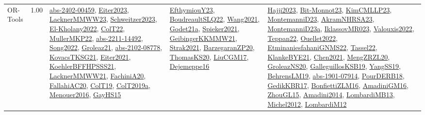 {\begin{longtable}{p{3cm}r>{\raggedright\arraybackslash}p{6cm}>{\raggedright\arraybackslash}p{6cm}>{\raggedright\arraybackslash}p{8cm}}
\index{OR-Tools}\index{CPSystems!OR-Tools}OR-Tools &  1.00 & \hyperref[detail:abs-2402-00459]{abs-2402-00459}, \hyperref[detail:Eiter2023]{Eiter2023}, \hyperref[detail:LacknerMMWW23]{LacknerMMWW23}, \hyperref[detail:Schweitzer2023]{Schweitzer2023}, \hyperref[detail:El-Kholany2022]{El-Kholany2022}, \hyperref[detail:ColT22]{ColT22}, \hyperref[detail:MullerMKP22]{MullerMKP22}, \hyperref[detail:abs-2211-14492]{abs-2211-14492}, \hyperref[detail:Song2022]{Song2022}, \hyperref[detail:Groleaz21]{Groleaz21}, \hyperref[detail:abs-2102-08778]{abs-2102-08778}, \hyperref[detail:KovacsTKSG21]{KovacsTKSG21}, \hyperref[detail:Eiter2021]{Eiter2021}, \hyperref[detail:KoehlerBFFHPSSS21]{KoehlerBFFHPSSS21}, \hyperref[detail:LacknerMMWW21]{LacknerMMWW21}, \hyperref[detail:FachiniA20]{FachiniA20}, \hyperref[detail:FallahiAC20]{FallahiAC20}, \hyperref[detail:ColT19]{ColT19}, \hyperref[detail:ColT2019a]{ColT2019a}, \hyperref[detail:Menouer2016]{Menouer2016}, \hyperref[detail:GayHS15]{GayHS15} & \hyperref[detail:EfthymiouY23]{EfthymiouY23}, \hyperref[detail:BoudreaultSLQ22]{BoudreaultSLQ22}, \hyperref[detail:Wang2021]{Wang2021}, \hyperref[detail:Godet21a]{Godet21a}, \hyperref[detail:Spieker2021]{Spieker2021}, \hyperref[detail:GeibingerKKMMW21]{GeibingerKKMMW21}, \hyperref[detail:Strak2021]{Strak2021}, \hyperref[detail:BarzegaranZP20]{BarzegaranZP20}, \hyperref[detail:ThomasKS20]{ThomasKS20}, \hyperref[detail:LiuCGM17]{LiuCGM17}, \hyperref[detail:Dejemeppe16]{Dejemeppe16} & \hyperref[detail:Hajji2023]{Hajji2023}, \hyperref[detail:Bit-Monnot23]{Bit-Monnot23}, \hyperref[detail:KimCMLLP23]{KimCMLLP23}, \hyperref[detail:MontemanniD23]{MontemanniD23}, \hyperref[detail:AkramNHRSA23]{AkramNHRSA23}, \hyperref[detail:MontemanniD23a]{MontemanniD23a}, \hyperref[detail:IklassovMR023]{IklassovMR023}, \hyperref[detail:Valouxis2022]{Valouxis2022}, \hyperref[detail:Teppan22]{Teppan22}, \hyperref[detail:Ouellet2022]{Ouellet2022}, \hyperref[detail:EtminaniesfahaniGNMS22]{EtminaniesfahaniGNMS22}, \hyperref[detail:Tassel22]{Tassel22}, \hyperref[detail:KlankeBYE21]{KlankeBYE21}, \hyperref[detail:Chen2021]{Chen2021}, \hyperref[detail:MengZRZL20]{MengZRZL20}, \hyperref[detail:GroleazNS20]{GroleazNS20}, \hyperref[detail:GalleguillosKSB19]{GalleguillosKSB19}, \hyperref[detail:YangSS19]{YangSS19}, \hyperref[detail:BehrensLM19]{BehrensLM19}, \hyperref[detail:abs-1901-07914]{abs-1901-07914}, \hyperref[detail:PourDERB18]{PourDERB18}, \hyperref[detail:GedikKBR17]{GedikKBR17}, \hyperref[detail:BonfiettiZLM16]{BonfiettiZLM16}, \hyperref[detail:AmadiniGM16]{AmadiniGM16}, \hyperref[detail:ZhouGL15]{ZhouGL15}, \hyperref[detail:Amadini2014]{Amadini2014}, \hyperref[detail:LombardiMB13]{LombardiMB13}, \hyperref[detail:Michel2012]{Michel2012}, \hyperref[detail:LombardiM12]{LombardiM12}\\

\end{longtable}}
